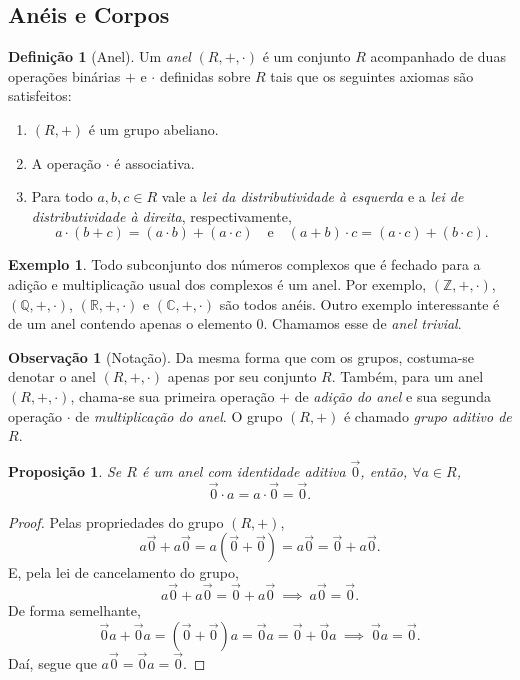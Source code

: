 \documentclass[a4paper,12pt]{report}
\theoremstyle{plain}
\newtheorem{proposicao}{Proposição}[section]
\theoremstyle{definition}
\newtheorem{definicao}{Definição}[section]
\newtheorem{observacao}{Observação}[section]
\newtheorem{exemplo}{Exemplo}[section]
\begin{document}
	
	
	
	\subsection{Anéis e Corpos}
	
	\begin{definicao}[Anel]
		Um \emph{anel} $(R, +, \cdot)$ é um conjunto $R$ acompanhado de duas operações binárias $+$ e $\cdot$ definidas sobre $R$ tais que os seguintes axiomas são satisfeitos:
		\begin{enumerate}
			\item $(R, +)$ é um grupo abeliano.
			\item A operação $\cdot$ é associativa.
			\item Para todo $a,b,c\in R$ vale a \emph{lei da distributividade à esquerda} e a \emph{lei de distributividade à direita}, respectivamente, $$a\cdot(b+c) = (a\cdot b) + (a\cdot c)\quad \text{e} \quad (a+b)\cdot c = (a\cdot c) + (b\cdot c).$$
		\end{enumerate}
	\end{definicao}
	
	\begin{exemplo}
		Todo subconjunto dos números complexos que é fechado para a adição e multiplicação usual dos complexos é um anel. Por exemplo, $(\mathbb{Z}, +, \cdot)$, $(\mathbb{Q}, +, \cdot)$, $(\mathbb{R}, +, \cdot)$ e $(\mathbb{C}, +, \cdot)$ são todos anéis.
		Outro exemplo interessante é de um anel contendo apenas o elemento $0$. Chamamos esse de \emph{anel trivial}.
	\end{exemplo}
	
	\begin{observacao}[Notação]
		Da mesma forma que com os grupos, costuma-se denotar o anel $(R, +, \cdot)$ apenas por seu conjunto $R$. Também, para um anel $(R, +, \cdot)$, chama-se sua primeira operação $+$ de \emph{adição do anel} e sua segunda operação $\cdot$ de \emph{multiplicação do anel}. O grupo $(R,+)$ é chamado \emph{grupo aditivo de $R$}.
	\end{observacao}
	
	\begin{proposicao}
		Se $R$ é um anel com identidade aditiva $\vec 0$, então, $\forall a \in R$, $$\vec 0 \cdot a = a \cdot \vec 0 = \vec 0.$$
	\end{proposicao}
	\begin{proof}
		Pelas propriedades do grupo $(R, +)$, $$a\vec 0 + a\vec 0 = a(\vec 0 + \vec 0) = a\vec 0 = \vec 0 + a\vec 0.$$ E, pela lei de cancelamento do grupo, $$a\vec0 + a\vec 0 = \vec 0 + a\vec 0 \ \implies \ a\vec 0 = \vec 0.$$
		De forma semelhante, $$\vec 0a + \vec 0a = (\vec 0 + \vec 0)a = \vec 0a = \vec 0 + \vec 0a \ \implies \ \vec 0a = \vec 0.$$ Daí, segue que $a\vec 0 = \vec 0a = \vec 0$. 
	\end{proof}
	
\end{document}

